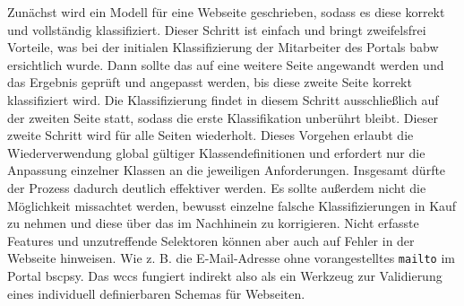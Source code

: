     Zunächst wird ein Modell für eine Webseite geschrieben,
    sodass es diese korrekt und vollständig klassifiziert.
    Dieser Schritt ist einfach und bringt zweifelsfrei Vorteile,
    was bei der initialen Klassifizierung der Mitarbeiter des Portals \gls{babw} ersichtlich wurde.
    Dann sollte das {\classificationModel} auf eine weitere Seite angewandt werden und
    das Ergebnis geprüft und angepasst werden,
    bis diese zweite Seite korrekt klassifiziert wird.
    Die Klassifizierung findet in diesem Schritt ausschließlich auf der zweiten Seite statt,
    sodass die erste Klassifikation unberührt bleibt.
    Dieser zweite Schritt wird für alle Seiten wiederholt.
    Dieses Vorgehen erlaubt die Wiederverwendung global gültiger Klassendefinitionen
    und erfordert nur die Anpassung einzelner Klassen an die jeweiligen Anforderungen.
    Insgesamt dürfte der Prozess dadurch deutlich effektiver werden.
    Es sollte außerdem nicht die Möglichkeit missachtet werden,
    bewusst einzelne falsche Klassifizierungen in Kauf zu nehmen
    und diese über das {\annotatorPlugin} im Nachhinein zu korrigieren.
    Nicht erfasste Features und unzutreffende Selektoren können
    aber auch auf Fehler in der Webseite hinweisen.
    Wie z. B. die E-Mail-Adresse ohne vorangestelltes \texttt{mailto}
    im Portal \gls{bscpsy}.
    Das \gls{wccs} fungiert indirekt also als ein Werkzeug
    zur Validierung eines individuell definierbaren Schemas für Webseiten.